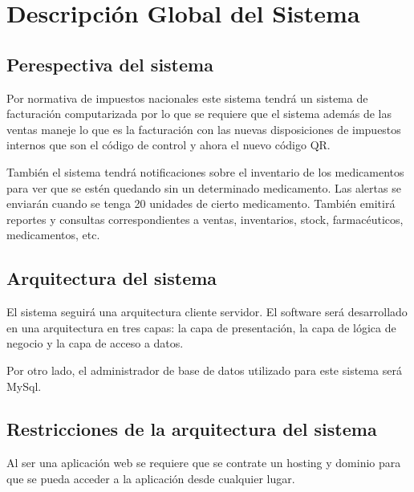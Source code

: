 \section{Descripción Global del Sistema}
\subsection{Perespectiva del sistema}
Por normativa de impuestos nacionales este sistema tendrá un sistema de facturación computarizada por lo que se requiere que el sistema además de las ventas maneje lo que es la facturación con las nuevas disposiciones de impuestos internos que son el código de control y ahora el nuevo código QR.

También el sistema tendrá notificaciones sobre el inventario de los medicamentos para ver que se estén quedando sin un determinado medicamento. Las alertas se enviarán cuando se tenga 20 unidades de cierto medicamento. También emitirá reportes y consultas correspondientes a ventas, inventarios, stock, farmacéuticos, medicamentos, etc.

\subsection{Arquitectura del sistema}
El sistema seguirá una arquitectura cliente servidor. El software será desarrollado en una arquitectura en tres capas: la capa de presentación, la capa de lógica de negocio y la capa de acceso a datos.

Por otro lado, el administrador de base de datos utilizado para este sistema será MySql.
\subsection{Restricciones de la arquitectura del sistema}
Al ser una aplicación web se requiere que se contrate un hosting y dominio para que se pueda acceder a la aplicación desde cualquier lugar.

